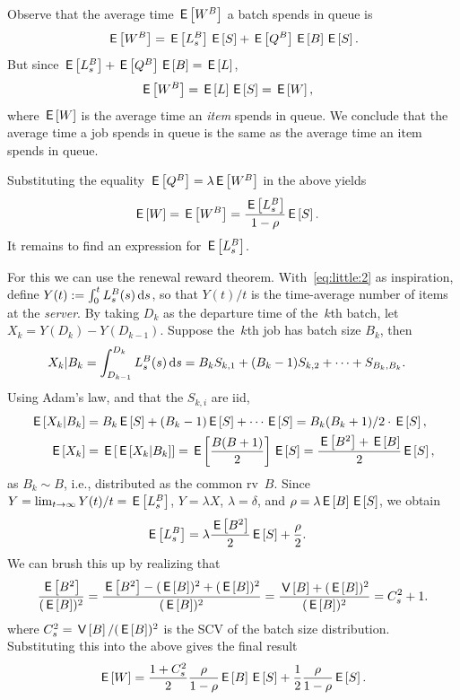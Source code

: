 \documentclass[queueing-book.tex]{subfiles}
\begin{document}
Observe that the average time $\E{\W^{B}}$ a batch spends in queue is
\begin{equation*}
  \E{\W^B} =  \E{\Ls^B}\E S + \E{\QQ^B} \E B \E S.
\end{equation*}
But since $\E{\Ls^B} + \E{\QQ^B} \E B = \E \L$,
\begin{align*}
  \E{\W^B} &=  \E\L \E S = \E{\W},
\end{align*}
where $\E W$ is the average time an \emph{item} spends in queue.
We conclude that the average time a job spends in queue is the same as the average time an item spends in queue.

Substituting the equality  $\E{\QQ^B} = \lambda \E{\W^B}$  in the above yields
\begin{align}\label{eq:96}
\E W =  \E{\W^B} &= \frac{\E{\Ls^B}}{1-\rho}\E{S}.
\end{align}
It remains to find an expression for $\E{\Ls^B}$.

For this we can use the renewal reward theorem.
With~\cref{eq:little:2} as inspiration, define $Y(t) := \int_0^t \Ls^B(s) \d s$, so that $Y(t)/t$  is the time-average number of items at the \emph{server}.
By taking $D_k$ as the departure time of the~$k$th batch, let $X_k = Y(D_k)-Y(D_{k-1})$.
Suppose the~$k$th job has batch size $B_{k}$, then
  \begin{align*}
    X_k|B_{k} &= \int_{D_{k-1}}^{D_k} \Ls^B(s) \d s
    = B_{k} S_{k,1} + (B_{k}-1)S_{k,2} + \cdots + S_{B_{k}, B_{k}}.
  \end{align*}
Using Adam's law, and that the $S_{k,i}$ are iid,
\begin{align*}
    \E{X_k | B_k} &= B_{k}\E S + (B_{k}-1)\E S + \cdots \E S = B_{k}(B_{k}+1)/2 \cdot \E S, \\
    \E{X_k} & = \E{\E{X_k| B_k}} = \E{\frac{B(B+1)}2} \E S =    \frac{\E{B^2}+\E B}2 \E S,
\end{align*}
as $B_{k}\sim B$, i.e., distributed as the common rv~$B$.
Since $Y=\lim_{t\to\infty} Y(t)/t = \E{\Ls^{B}}$, $Y=\lambda X$, $\lambda = \delta$, and $\rho=\lambda \E B \E S$, we obtain
\begin{align}\label{eq:17}
  \E{\Ls^B} &= \lambda \frac{\E{B^2}}2\E S + \frac\rho 2. %
\end{align}
We can brush this up by realizing that
\begin{align*}
\frac{\E{B^2}}{(\E{B})^2}
  =\frac{\E{B^2}-(\E B)^2 + (\E B)^2}{(\E{B})^2}
= \frac{\V B + (\E B)^2}{(\E B)^2}= C_s^2+1.
\end{align*}
where $C_s^2 = \V B/ (\E B)^{2}$ is the SCV of the batch size distribution.  Substituting this into the above gives the final result
\begin{equation}\label{eq:43}
\E{\W} =
\frac{1+C_s^2}2 \frac{\rho}{1-\rho} \E B \E S + \frac12\frac\rho{1-\rho} \E S.
\end{equation}
\end{document}
